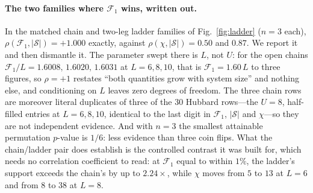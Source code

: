 \paragraph{The two families where $\mathcal F_1$ wins, written out.} In the matched chain and two-leg
ladder families of Fig.~\ref{fig:ladder} ($n=3$ each), $\rho(\mathcal F_1,|\mathcal S|)=+1.000$ exactly,
against $\rho(\chi,|\mathcal S|)=0.50$ and $0.87$. We report it and then dismantle it. The parameter swept
there is $L$, not $U$: for the open chains $\mathcal F_1/L=1.6008,\,1.6020,\,1.6031$ at $L=6,8,10$, that
is $\mathcal F_1=1.60\,L$ to three figures, so $\rho=+1$ restates ``both quantities grow with system
size'' and nothing else, and conditioning on $L$ leaves zero degrees of freedom. The three chain rows are
moreover literal duplicates of three of the $30$ Hubbard rows---the $U=8$, half-filled entries at
$L=6,8,10$, identical to the last digit in $\mathcal F_1$, $|\mathcal S|$ and $\chi$---so they are not
independent evidence. And with $n=3$ the smallest attainable permutation $p$-value is $1/6$: less evidence
than three coin flips. What the chain/ladder pair does establish is the controlled contrast it was built
for, which needs no correlation coefficient to read: at $\mathcal F_1$ equal to within $1\%$, the ladder's
support exceeds the chain's by up to $2.24\times$, while $\chi$ moves from $5$ to $13$ at $L=6$ and
from $8$ to $38$ at $L=8$.

